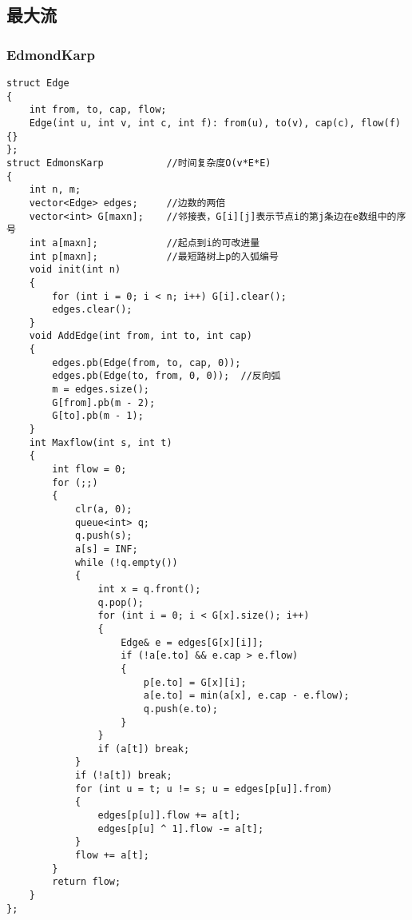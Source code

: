 \documentclass[a4]{article}
\begin{document}
\subsection{最大流}
\subsubsection{EdmondKarp}
\begin{lstlisting}
struct Edge
{
    int from, to, cap, flow;
    Edge(int u, int v, int c, int f): from(u), to(v), cap(c), flow(f) {}
};
struct EdmonsKarp           //时间复杂度O(v*E*E)
{
    int n, m;
    vector<Edge> edges;     //边数的两倍
    vector<int> G[maxn];    //邻接表，G[i][j]表示节点i的第j条边在e数组中的序号
    int a[maxn];            //起点到i的可改进量
    int p[maxn];            //最短路树上p的入弧编号
    void init(int n)
    {
        for (int i = 0; i < n; i++) G[i].clear();
        edges.clear();
    }
    void AddEdge(int from, int to, int cap)
    {
        edges.pb(Edge(from, to, cap, 0));
        edges.pb(Edge(to, from, 0, 0));  //反向弧
        m = edges.size();
        G[from].pb(m - 2);
        G[to].pb(m - 1);
    }
    int Maxflow(int s, int t)
    {
        int flow = 0;
        for (;;)
        {
            clr(a, 0);
            queue<int> q;
            q.push(s);
            a[s] = INF;
            while (!q.empty())
            {
                int x = q.front();
                q.pop();
                for (int i = 0; i < G[x].size(); i++)
                {
                    Edge& e = edges[G[x][i]];
                    if (!a[e.to] && e.cap > e.flow)
                    {
                        p[e.to] = G[x][i];
                        a[e.to] = min(a[x], e.cap - e.flow);
                        q.push(e.to);
                    }
                }
                if (a[t]) break;
            }
            if (!a[t]) break;
            for (int u = t; u != s; u = edges[p[u]].from)
            {
                edges[p[u]].flow += a[t];
                edges[p[u] ^ 1].flow -= a[t];
            }
            flow += a[t];
        }
        return flow;
    }
};
\end{lstlisting}
\end{document}
